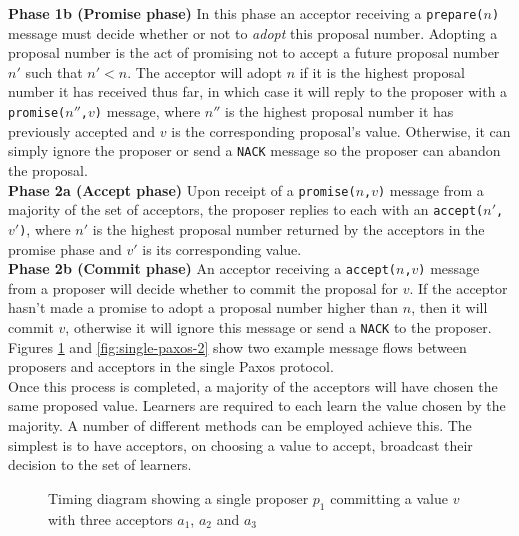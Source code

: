 \textbf{Phase 1b (Promise phase)} In this phase an acceptor receiving a \texttt{prepare($n$)} message must decide whether or not to \emph{adopt} this proposal number. Adopting a proposal number is the act of promising not to accept a future proposal number $n'$ such that $n' < n$. The acceptor will adopt $n$ if it is the highest proposal number it has received thus far, in which case it will reply to the proposer with a \texttt{promise($n''$,$v$)} message, where $n''$ is the highest proposal number it has previously accepted and $v$ is the corresponding proposal's value. Otherwise, it can simply ignore the proposer or send a \texttt{NACK} message so the proposer can abandon the proposal. \\

\textbf{Phase 2a (Accept phase)} Upon receipt of a \texttt{promise($n$,$v$)} message from a majority of the set of acceptors, the proposer replies to each with an \texttt{accept($n'$,$v'$)}, where $n'$ is the highest proposal number returned by the acceptors in the promise phase and $v'$ is its corresponding value. \\

\textbf{Phase 2b (Commit phase)} An acceptor receiving a \texttt{accept($n$,$v$)} message from a proposer will decide whether to commit the proposal for $v$. If the acceptor hasn't made a promise to adopt a proposal number higher than $n$, then it will commit $v$, otherwise it will ignore this message or send a \texttt{NACK} to the proposer. \\

Figures \ref{fig:single-paxos-1} and \ref{fig:single-paxos-2} show two example message flows between proposers and acceptors in the single Paxos protocol. \\

Once this process is completed, a majority of the acceptors will have chosen the same proposed value. Learners are required to each learn the value chosen by the majority. A number of different methods can be employed achieve this. The simplest is to have acceptors, on choosing a value to accept, broadcast their decision to the set of learners. \\

\begin{figure}
  \centering
  
  \caption{Timing diagram showing a single proposer $p_1$ committing a value $v$ with three acceptors $a_1$, $a_2$ and $a_3$}
  \label{fig:single-paxos-1}  
\end{figure}

